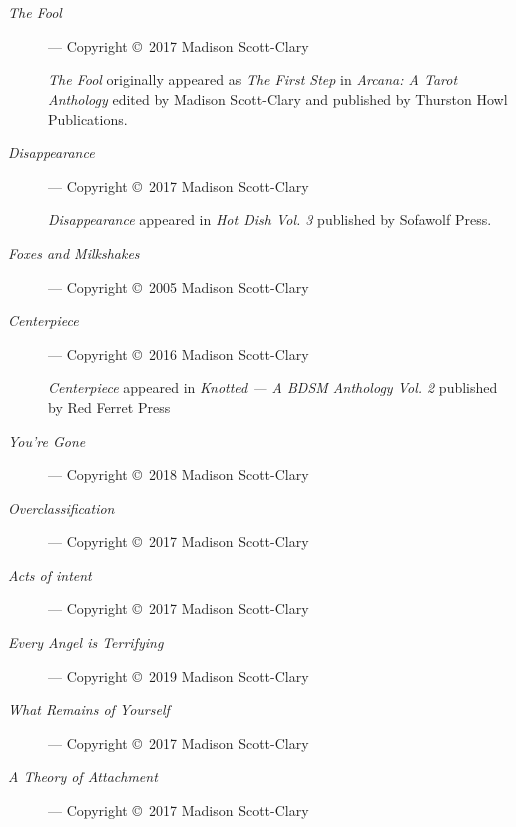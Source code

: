 \chapter*{}

\begin{description}
    \item[\emph{The Fool}]
    --- Copyright \copyright\ 2017 Madison Scott-Clary

    \emph{The Fool} originally appeared as \emph{The First Step} in \emph{Arcana: A Tarot Anthology} edited by Madison Scott-Clary and published by Thurston Howl Publications.
    \item[\emph{Disappearance}]
    --- Copyright \copyright\ 2017 Madison Scott-Clary

    \emph{Disappearance} appeared in \emph{Hot Dish Vol. 3} published by Sofawolf Press.
    \item[\emph{Foxes and Milkshakes}]
    --- Copyright \copyright\ 2005 Madison Scott-Clary
    \item[\emph{Centerpiece}]
    --- Copyright \copyright\ 2016 Madison Scott-Clary

    \emph{Centerpiece} appeared in \emph{Knotted --- A BDSM Anthology Vol. 2} published by Red Ferret Press
    \item[\emph{You're Gone}] --- Copyright \copyright\ 2018 Madison Scott-Clary
    \item[\emph{Overclassification}]
    --- Copyright \copyright\ 2017 Madison Scott-Clary
    \item[\emph{Acts of intent}]
    --- Copyright \copyright\ 2017 Madison Scott-Clary
    \item[\emph{Every Angel is Terrifying}]
    --- Copyright \copyright\ 2019 Madison Scott-Clary
    \item[\emph{What Remains of Yourself}]
    --- Copyright \copyright\ 2017 Madison Scott-Clary
    \item[\emph{A Theory of Attachment}]
    --- Copyright \copyright\ 2017 Madison Scott-Clary
\end{description}
